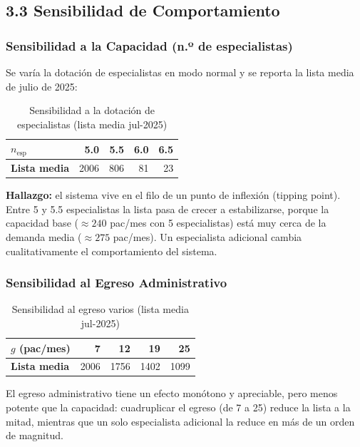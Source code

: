 \documentclass[12pt,a4paper]{article}
\begin{document}
\subsection*{3.3 Sensibilidad de Comportamiento}
\subsubsection*{Sensibilidad a la Capacidad (n.º de especialistas)}
Se varía la dotación de especialistas en modo normal y se reporta la lista media de julio de 2025:

\begin{table}[H]
\centering
\caption{Sensibilidad a la dotación de especialistas (lista media jul-2025)}
\label{tab:sens_cap}
\begin{tabular}{@{}lrrrr@{}}
\toprule
\rowcolor{azulDS!15}
\textbf{$n_{\text{esp}}$} & 5.0 & 5.5 & 6.0 & 6.5 \\
\midrule
\textbf{Lista media} & 2006 & 806 & 81 & 23 \\
\bottomrule
\end{tabular}
\end{table}

\textbf{Hallazgo:} el sistema vive en el filo de un punto de inflexión (tipping point). Entre 5 y 5.5 especialistas la lista pasa de crecer a estabilizarse, porque la capacidad base ($\approx 240$ pac/mes con 5 especialistas) está muy cerca de la demanda media ($\approx 275$ pac/mes). Un especialista adicional cambia cualitativamente el comportamiento del sistema.

\subsubsection*{Sensibilidad al Egreso Administrativo}

\begin{table}[H]
\centering
\caption{Sensibilidad al egreso varios (lista media jul-2025)}
\label{tab:sens_egr}
\begin{tabular}{@{}lrrrr@{}}
\toprule
\rowcolor{azulDS!15}
\textbf{$g$ (pac/mes)} & 7 & 12 & 19 & 25 \\
\midrule
\textbf{Lista media} & 2006 & 1756 & 1402 & 1099 \\
\bottomrule
\end{tabular}
\end{table}

El egreso administrativo tiene un efecto monótono y apreciable, pero menos potente que la capacidad: cuadruplicar el egreso (de 7 a 25) reduce la lista a la mitad, mientras que un solo especialista adicional la reduce en más de un orden de magnitud.
\end{document}
